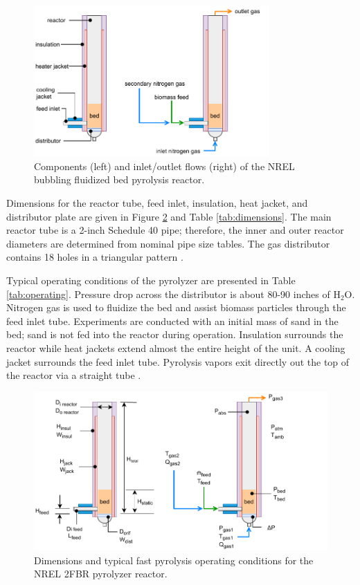 \documentclass[12pt,titlepage]{article}
\begin{document}
\begin{figure}[H]
    \centering
    \includegraphics[width=0.8\textwidth]{figures/pyrolyzer1.pdf}
    \caption{Components (left) and inlet/outlet flows (right) of the NREL bubbling fluidized bed pyrolysis reactor.}
    \label{fig:pyrolyzer1}
\end{figure}

Dimensions for the reactor tube, feed inlet, insulation, heat jacket, and distributor plate are given in Figure \ref{fig:pyrolyzer2} and Table \ref{tab:dimensions}. The main reactor tube is a 2-inch Schedule 40 pipe; therefore, the inner and outer reactor diameters are determined from nominal pipe size tables. The gas distributor contains 18 holes in a triangular pattern \cite{French-2019}.

Typical operating conditions of the pyrolyzer are presented in Table \ref{tab:operating}. Pressure drop across the distributor is about 80-90 inches of H$_2$O. Nitrogen gas is used to fluidize the bed and assist biomass particles through the feed inlet tube. Experiments are conducted with an initial mass of sand in the bed; sand is not fed into the reactor during operation. Insulation surrounds the reactor while heat jackets extend almost the entire height of the unit. A cooling jacket surrounds the feed inlet tube. Pyrolysis vapors exit directly out the top of the reactor via a straight tube \cite{French-2019}.

\begin{figure}[H]
    \centering
    \includegraphics[width=\textwidth]{figures/pyrolyzer2.pdf}
    \caption{Dimensions and typical fast pyrolysis operating conditions for the NREL 2FBR pyrolyzer reactor.}
    \label{fig:pyrolyzer2}
\end{figure}
\end{document}
